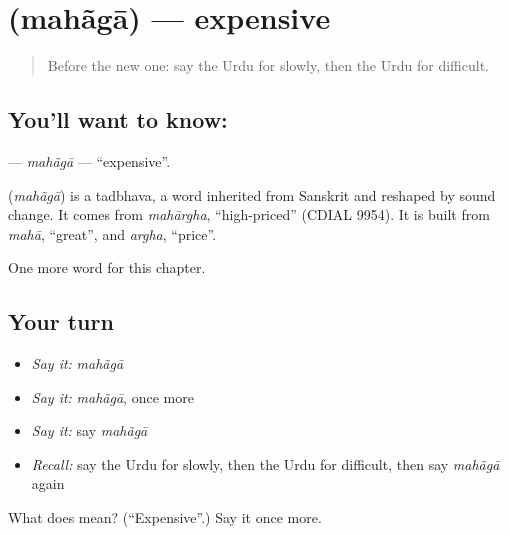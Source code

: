 \section[\texorpdfstring{\ur{مہنگا} (mahãgā)}{مہنگا (mahãgā)}]{ (mahãgā) — expensive}

\label{lesson:UR-C71-mahaga}



\begin{quote}
Before the new one: say the Urdu for slowly, then the Urdu for difficult.
\end{quote}

\subsection*{You'll want to know: }
\textbf{} — \emph{mahãgā} — \textquotedblleft{}expensive\textquotedblright{}.

\begin{cousinweb}
\textbf{} (\emph{mahãgā}) is a tadbhava, a word inherited from Sanskrit and reshaped by sound change. It comes from \emph{mahārgha}, \textquotedblleft{}high-priced\textquotedblright{} (CDIAL 9954). It is built from \emph{mahā}, \textquotedblleft{}great\textquotedblright{}, and \emph{argha}, \textquotedblleft{}price\textquotedblright{}.
\end{cousinweb}

\begin{grammarlens}[title={What you've built}]
One more word for this chapter.
\end{grammarlens}

\subsection*{Your turn}
\begin{itemize}
\raggedright
  \item \emph{Say it:} \emph{mahãgā}
  \item \emph{Say it:} \emph{mahãgā}, once more
  \item \emph{Say it:} say \emph{mahãgā}
  \item \emph{Recall:} say the Urdu for slowly, then the Urdu for difficult, then say \emph{mahãgā} again
\end{itemize}

\begin{tcolorbox}[breakable,colback=teal!4,colframe=teal!35!black,title={Before you move on}]
What does  mean? (\textquotedblleft{}Expensive\textquotedblright{}.) Say it once more.
\end{tcolorbox}
